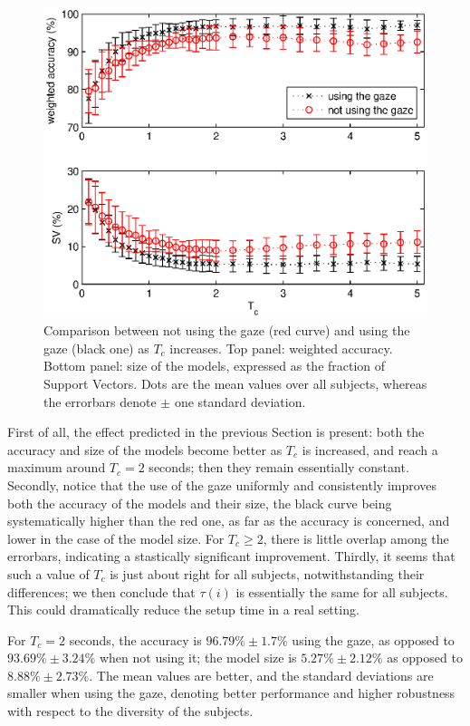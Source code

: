 \documentclass[jou,a4paper,notxfonts]{apa}
\begin{document}
\begin{figure}[!ht]
  \centering
    \includegraphics[width=\linewidth]{figs/comparison.eps}
    \caption{Comparison between not using the gaze (red curve) and
    using the gaze (black one) as $T_c$ increases. Top panel: weighted
    accuracy. Bottom panel: size of the models, expressed as the
    fraction of Support Vectors. Dots are the mean values over all
    subjects, whereas the errorbars denote $\pm$ one standard deviation.}
    \label{fig:comparison}
\end{figure}

First of all, the effect predicted in the previous Section is present:
both the accuracy and size of the models become better as $T_c$ is
increased, and reach a maximum around $T_c=2$ seconds; then they
remain essentially constant. Secondly, notice that the use of the gaze
uniformly and consistently improves both the accuracy of the models
and their size, the black curve being systematically higher than the
red one, as far as the accuracy is concerned, and lower in the case of
the model size. For $T_c\geq 2$, there is little overlap among the
errorbars, indicating a stastically significant improvement. Thirdly,
it seems that such a value of $T_c$ is just about right for all
subjects, notwithstanding their differences; we then conclude that
$\tau(i)$ is essentially the same for all subjects. This could
dramatically reduce the setup time in a real setting.

For $T_c=2$ seconds, the accuracy is $96.79\% \pm 1.7\%$ using the
gaze, as opposed to $93.69\% \pm 3.24\%$ when not using it; the model
size is $5.27\% \pm 2.12\%$ as opposed to $8.88\% \pm 2.73\%$. The
mean values are better, and the standard deviations are smaller when
using the gaze, denoting better performance and higher robustness with
respect to the diversity of the subjects.
\end{document}
